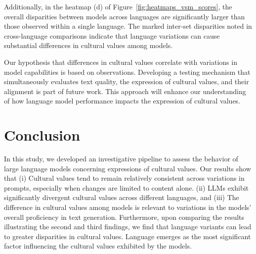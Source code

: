 \documentclass[11pt]{article}
\begin{document}
Additionally, in the heatmap (d) of Figure~\ref{fig:heatmaps_vsm_scores}, the overall disparities between models across languages are significantly larger than those observed within a single language. The marked inter-set disparities noted in cross-language comparisons indicate that language variations can cause substantial differences in cultural values among models.

Our hypothesis that differences in cultural values correlate with variations in model capabilities is based on observations. Developing a testing mechanism that simultaneously evaluates text quality, the expression of cultural values, and their alignment is part of future work. This approach will enhance our understanding of how language model performance impacts the expression of cultural values.

\section{Conclusion}

In this study, we developed an investigative pipeline to assess the behavior of large language models concerning expressions of cultural values. Our results show that (i) Cultural values tend to remain relatively consistent across variations in prompts, especially when changes are limited to content alone. (ii) LLMs exhibit significantly divergent cultural values across different languages, and (iii) The difference in cultural values among models is relevant to variations in the models' overall proficiency in text generation. Furthermore, upon comparing the results illustrating the second and third findings, we find that language variants can lead to greater disparities in cultural values. Language emerges as the most significant factor influencing the cultural values exhibited by the models.


\end{document}
